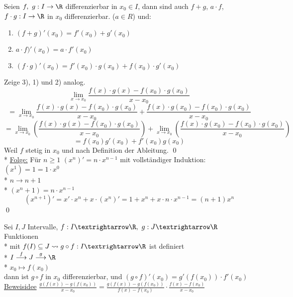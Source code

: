 Seien $f,\ g: I \to \R$ differenzierbar in $x_0 \in I$, dann sind auch $f + g$, $a \cdot f$, $f \cdot g: I \to \R$ in $x_0$ differenzierbar. ($a \in R$) und:
\begin{enumerate}
\item{$(f + g)'(x_0) = f'(x_0) + g'(x_0)$}
\item{$a \cdot f)'(x_0) = a \cdot f'(x_0)$}
\item{$(f \cdot g)'(x_0) = f'(x_0) \cdot g(x_0) + f(x_0) \cdot g'(x_0)$}
\end{enumerate}
\bew
Zeige 3), 1) und 2) analog.\\
$$ \lim_{x \to x_0} \frac{f(x) \cdot g(x) - f(x_0) \cdot g(x_0)}{x - x_0}$$
$$= \lim_{x \to x_0} \frac{f(x) \cdot g(x) - f(x_0) \cdot g(x_0)}{x - x_0} + \frac{f(x) \cdot g(x_0) - f(x_0) \cdot g(x_0)}{x - x_0}$$
$$= \lim_{x \to x_0} \left( \frac{f(x) \cdot g(x) - f(x_0) \cdot g(x_0)}{x - x_0} \right) + \lim_{x \to x_0}\left( \frac{f(x) \cdot g(x_0) - f(x_0) \cdot g(x_0)}{x - x_0} \right)$$
$$=f(x_0)g'(x_0) + f'(x_0)g(x_0)$$
Weil $f$ stetig in $x_0$ und nach Definition der Ableitung. \qed{}\\*
\ul{Folge:} Für $n \geq 1$ $(x^n)' = n \cdot x^{n-1}$
\bew
mit vollständiger Induktion:
$(x^1) = 1 =1 \cdot x^0$ \ok\\*
$n \to n + 1$\\*
$(x^n+1) = n\cdot x^{n-1}$
$$(x^{n+1})' = x' \cdot x^n + x \cdot (x^n)' = 1 + x^n + x \cdot n \cdot x^{n-1} = (n+1) x^n$$ \qed

Sei $I,J$ Intervalle, $f:I→\R,\ g:J→\R$ Funktionen\\*
mit $f(I)\subseteq J \leadsto g\circ f:I→\R$ ist definiert\\*
$I\stackrel{f}{\longrightarrow}J\stackrel{g}{\longrightarrow}\R$\\*
$x_0\longmapsto f(x_0)$\\
dann ist $g\circ f$ in $x_0$ differenzierbar,
und $(g\circ f)'(x_0)=g'(f(x_0))·f'(x_0)$\\
\ul{Beweisidee} $\frac{g(f(x)) - g(f(x_0))}{x-x_0} = \frac{g(f(x)) - g(f(x_0))}{f(x)-f(x_0)} \cdot \frac{f(x) - f(x_0)}{x-x_0}$